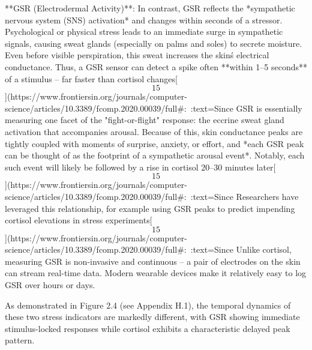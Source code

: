 \documentclass[12pt,a4paper]{article}
\begin{document}
**GSR (Electrodermal Activity)**: In contrast, GSR reflects the
*sympathetic nervous system (SNS) activation* and changes within seconds
of a stressor. Psychological or physical stress leads to an immediate
surge in sympathetic signals, causing sweat glands (especially on palms
and soles) to secrete moisture. Even before visible perspiration, this
sweat increases the skin\'s electrical conductance. Thus, a GSR sensor
can detect a spike often **within 1--5 seconds** of a stimulus -- far
faster than cortisol
changes[\[15\]](https://www.frontiersin.org/journals/computer-science/articles/10.3389/fcomp.2020.00039/full#:~:text=Since%
GSR is essentially measuring one facet of the "fight-or-flight"
response: the eccrine sweat gland activation that accompanies arousal.
Because of this, skin conductance peaks are tightly coupled with moments
of surprise, anxiety, or effort, and *each GSR peak can be thought of as
the footprint of a sympathetic arousal event*. Notably, each such event
will likely be followed by a rise in cortisol 20--30 minutes
later[\[15\]](https://www.frontiersin.org/journals/computer-science/articles/10.3389/fcomp.2020.00039/full#:~:text=Since%
Researchers have leveraged this relationship, for example using GSR
peaks to predict impending cortisol elevations in stress
experiments[\[15\]](https://www.frontiersin.org/journals/computer-science/articles/10.3389/fcomp.2020.00039/full#:~:text=Since%
Unlike cortisol, measuring GSR is non-invasive and continuous -- a pair
of electrodes on the skin can stream real-time data. Modern wearable
devices make it relatively easy to log GSR over hours or days.

As demonstrated in Figure 2.4 (see Appendix H.1), the temporal dynamics of these two stress indicators are markedly different, with GSR showing immediate stimulus-locked responses while cortisol exhibits a characteristic delayed peak pattern.
\end{document}
